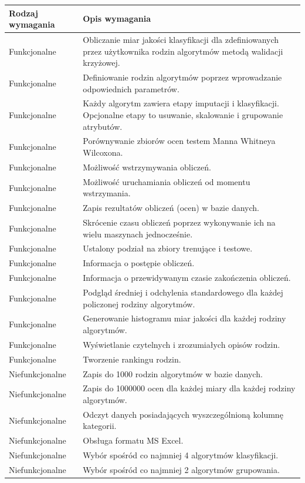 \documentclass[../thesis.tex]{subfiles}
\begin{document}
\begin{table}[h]
\begin{center}
\begin{tabular}{ | l | p{110mm} | }
\hline
\rowcolor{lightgray} Rodzaj wymagania & Opis wymagania \\\hline

Funkcjonalne & Obliczanie miar jakości klasyfikacji dla zdefiniowanych przez użytkownika rodzin algorytmów metodą walidacji krzyżowej. \\\hline
Funkcjonalne & Definiowanie rodzin algorytmów poprzez wprowadzanie odpowiednich parametrów. \\\hline
Funkcjonalne & Każdy algorytm zawiera etapy imputacji i klasyfikacji. Opcjonalne etapy to usuwanie, skalowanie i grupowanie atrybutów. \\\hline
Funkcjonalne & Porównywanie zbiorów ocen testem Manna Whitneya Wilcoxona. \\\hline
Funkcjonalne & Możliwość wstrzymywania obliczeń. \\\hline
Funkcjonalne & Możliwość uruchamiania obliczeń od momentu wstrzymania. \\\hline
Funkcjonalne & Zapis rezultatów obliczeń (ocen) w bazie danych. \\\hline
Funkcjonalne & Skrócenie czasu obliczeń poprzez wykonywanie ich na wielu maszynach jednocześnie. \\\hline
Funkcjonalne & Ustalony podział na zbiory trenujące i testowe. \\\hline
Funkcjonalne & Informacja o postępie obliczeń. \\\hline
Funkcjonalne & Informacja o przewidywanym czasie zakończenia obliczeń. \\\hline
Funkcjonalne & Podgląd średniej i odchylenia standardowego dla każdej policzonej rodziny algorytmów. \\\hline
Funkcjonalne & Generowanie histogramu miar jakości dla każdej rodziny algorytmów. \\\hline
Funkcjonalne & Wyświetlanie czytelnych i zrozumiałych opisów rodzin. \\\hline
Funkcjonalne & Tworzenie rankingu rodzin. \\\hline

Niefunkcjonalne & Zapis do 1000 rodzin algorytmów w bazie danych. \\\hline
Niefunkcjonalne & Zapis do 1000000 ocen dla każdej miary dla każdej rodziny algorytmów. \\\hline
Niefunkcjonalne & Odczyt danych posiadających wyszczególnioną kolumnę kategorii. \\\hline 
Niefunkcjonalne & Obsługa formatu MS Excel. \\\hline
Niefunkcjonalne & Wybór spośród co najmniej 4 algorytmów klasyfikacji. \\\hline 
Niefunkcjonalne & Wybór spośród co najmniej 2 algorytmów grupowania.\\\hline


\end{tabular}
\end{center}
\end{table}
\end{document}
